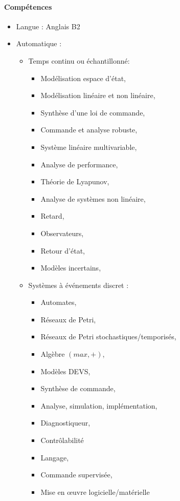 \documentclass{article}
\begin{document}
\paragraph{Compétences}
\begin{itemize}

\item Langue : Anglais B2

\item Automatique :
	\begin{itemize}
	\item Temps continu ou échantillonné:
		\begin{itemize}
		\item Modélisation espace d'état, 
		\item Modélisation linéaire et non linéaire,
		\item Synthèse d'une loi de commande, 
		\item Commande et analyse robuste, 
		\item Système linéaire multivariable, 
		\item Analyse de performance, 
		\item Théorie de Lyapunov,
		\item Analyse de systèmes non linéaire,
		\item Retard, %
		\item Observateurs,
		\item Retour d'état,
		\item Modèles incertains,
		\end{itemize}
	\item Systèmes à événements discret :
		\begin{itemize}
		\item Automates, 
		\item Réseaux de Petri, 
		\item Réseaux de Petri stochastiques/temporisés, 
		\item Algèbre $(max,+)$,
		\item Modèles DEVS,
		\item Synthèse de commande, 
		\item Analyse, simulation, implémentation, 
		\item Diagnostiqueur, 
		\item Contrôlabilité
		\item Langage, 
		\item Commande supervisée,
		\item Mise en \oe uvre logicielle/matérielle
		\end{itemize}
	\end{itemize}
	

\end{itemize}
\end{document}
